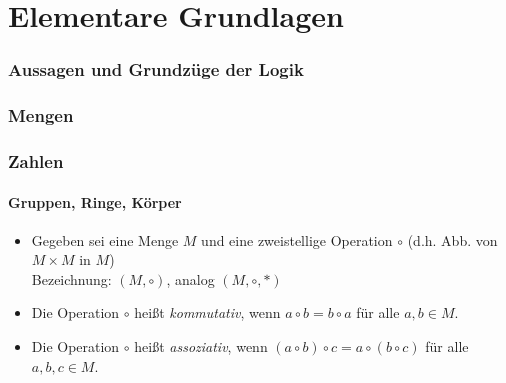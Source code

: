 





\maketitle
\newpage
\tableofcontents
\newpage


\part{Elementare Grundlagen}

\section{Aussagen und Grundzüge der Logik}
%

\section{Mengen}\label{sec:Mengen}
%

\section{Zahlen}
\subsection{Gruppen, Ringe, Körper}
\begin{itemize}
\item Gegeben sei eine Menge $M$ und eine zweistellige Operation $\circ$ (d.h. Abb. von $M\times M$ in $M$)\\
Bezeichnung: $(M,\circ)$, analog $(M, \circ, *)$
\item Die Operation $\circ$ heißt \emph{kommutativ}, wenn $a \circ b= b \circ a $ für alle $a, b \in M$.
\item Die Operation $\circ$ heißt \emph{assoziativ}, wenn $(a \circ b) \circ c =a \circ (b \circ c)$ für alle  $a, b, c \in M$.
\end{itemize}


